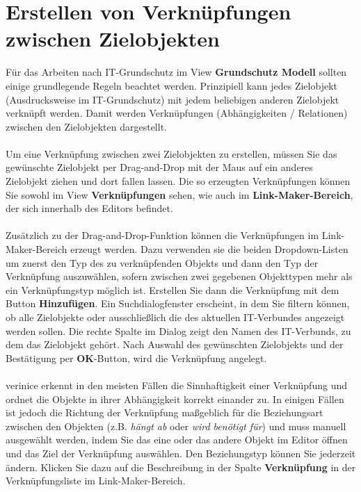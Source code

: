 \documentclass[a4paper,10pt]{book}
\begin{document}
\section{Erstellen von Verknüpfungen zwischen Zielobjekten}
\label{sec:bsiView_dd}
Für das Arbeiten nach IT-Grundschutz im View \textbf{Grundschutz
  Modell} sollten einige grundlegende Regeln beachtet werden.
Prinzipiell kann jedes Zielobjekt (Ausdrucksweise im IT-Grundschutz)
mit jedem beliebigen anderen Zielobjekt verknüpft werden.  Damit
werden Verknüpfungen (Abhängigkeiten / Relationen) zwischen den
Zielobjekten dargestellt.
\\\\
Um eine Verknüpfung zwischen zwei Zielobjekten zu erstellen, müssen
Sie das gewünschte Zielobjekt per Drag-and-Drop mit der Maus auf ein
anderes Zielobjekt ziehen und dort fallen lassen. Die so erzeugten
Verknüpfungen können Sie sowohl im View \textbf{Verknüpfungen} sehen,
wie auch im \textbf{Link-Maker-Bereich}, der sich innerhalb des
Editors befindet.
\\\\
Zusätzlich zu der Drag-and-Drop-Funktion können die Verknüpfungen im
Link-Maker-Bereich erzeugt werden. Dazu verwenden sie die beiden
Dropdown-Listen um zuerst den Typ des zu verknüpfenden Objekts und
dann den Typ der Verknüpfung auszuwählen, sofern zwischen zwei
gegebenen Objekttypen mehr als ein Verknüpfungstyp möglich
ist. Erstellen Sie dann die Verknüpfung mit dem Button
\textbf{Hinzufügen}. Ein Suchdialogfenster erscheint, in dem Sie
filtern können, ob alle Zielobjekte oder ausschließlich die des
aktuellen IT-Verbundes angezeigt werden sollen. Die rechte Spalte im
Dialog zeigt den Namen des IT-Verbunds, zu dem das Zielobjekt
gehört. Nach Auswahl des gewünschten Zielobjekts und der Bestätigung
per \textbf{OK}-Button, wird die Verknüpfung angelegt.
\\\\
verinice erkennt in den meisten Fällen die Sinnhaftigkeit einer
Verknüpfung und ordnet die Objekte in ihrer Abhängigkeit korrekt
einander zu. In einigen Fällen ist jedoch die Richtung der Verknüpfung
maßgeblich für die Beziehungsart zwischen den Objekten
(z.B. \textit{hängt ab} oder \textit{wird benötigt für}) und muss
manuell ausgewählt werden, indem Sie das eine oder das andere Objekt
im Editor öffnen und das Ziel der Verknüpfung auswählen. Den
Beziehungstyp können Sie jederzeit ändern. Klicken Sie dazu auf die
Beschreibung in der Spalte \textbf{Verknüpfung} in der
Verknüpfungsliste im Link-Maker-Bereich.
\end{document}
